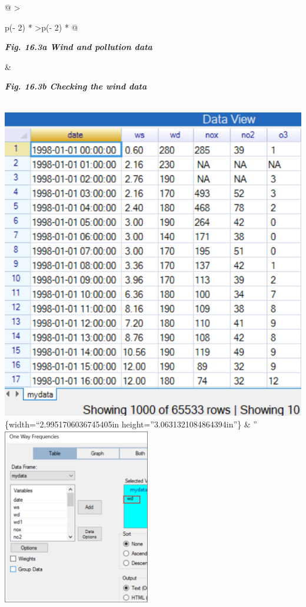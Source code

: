 \documentclass[
  letterpaper,
  DIV=11,
  numbers=noendperiod]{scrreprt}
\begin{document}
\begin{longtable}[]{@{}
  >{\raggedright\arraybackslash}p{(\columnwidth - 2\tabcolsep) * }
  >{\raggedleft\arraybackslash}p{(\columnwidth - 2\tabcolsep) * }@{}}
\toprule\noalign{}
\begin{minipage}[b]{\linewidth}\raggedright
\textbf{\emph{Fig. 16.3a Wind and pollution data}}
\end{minipage} & \begin{minipage}[b]{\linewidth}\raggedleft
\textbf{\emph{Fig. 16.3b Checking the wind data}}
\end{minipage} \\
\midrule\noalign{}
\endhead
\bottomrule\noalign{}
\endlastfoot
\includegraphics{figures/Fig16.3a.png}\{width=``2.9951706036745405in
height=''3.0631321084864394in''\} & ''
\includegraphics[width=2.52704in,height=3.07229in]{figures/Fig16.3b.png} \\
\end{longtable}
\end{document}
